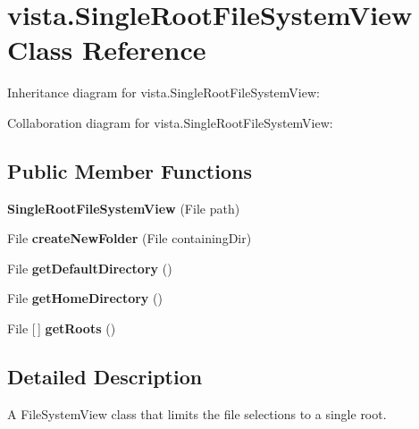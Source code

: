 \hypertarget{classvista_1_1_single_root_file_system_view}{}\section{vista.\+Single\+Root\+File\+System\+View Class Reference}
\label{classvista_1_1_single_root_file_system_view}


Inheritance diagram for vista.\+Single\+Root\+File\+System\+View\+:


Collaboration diagram for vista.\+Single\+Root\+File\+System\+View\+:
\subsection*{Public Member Functions}
\begin{DoxyCompactItemize}
\item 
\mbox{\label{classvista_1_1_single_root_file_system_view_a12c6cd626588f78090c0449a111b38ee}} 
{\bfseries Single\+Root\+File\+System\+View} (File path)
\item 
\mbox{\label{classvista_1_1_single_root_file_system_view_abbc2d9a43fd3e8a73900433739f716f9}} 
File {\bfseries create\+New\+Folder} (File containing\+Dir)
\item 
\mbox{\label{classvista_1_1_single_root_file_system_view_a4160416c2105f1368d3de89ea1bd9f30}} 
File {\bfseries get\+Default\+Directory} ()
\item 
\mbox{\label{classvista_1_1_single_root_file_system_view_a568ece1a85f1d3e213cbd8a7819aa110}} 
File {\bfseries get\+Home\+Directory} ()
\item 
\mbox{\label{classvista_1_1_single_root_file_system_view_a618f89445cbaed2879f3a26a761d8c94}} 
File \mbox{[}$\,$\mbox{]} {\bfseries get\+Roots} ()
\end{DoxyCompactItemize}


\subsection{Detailed Description}
A File\+System\+View class that limits the file selections to a single root.

